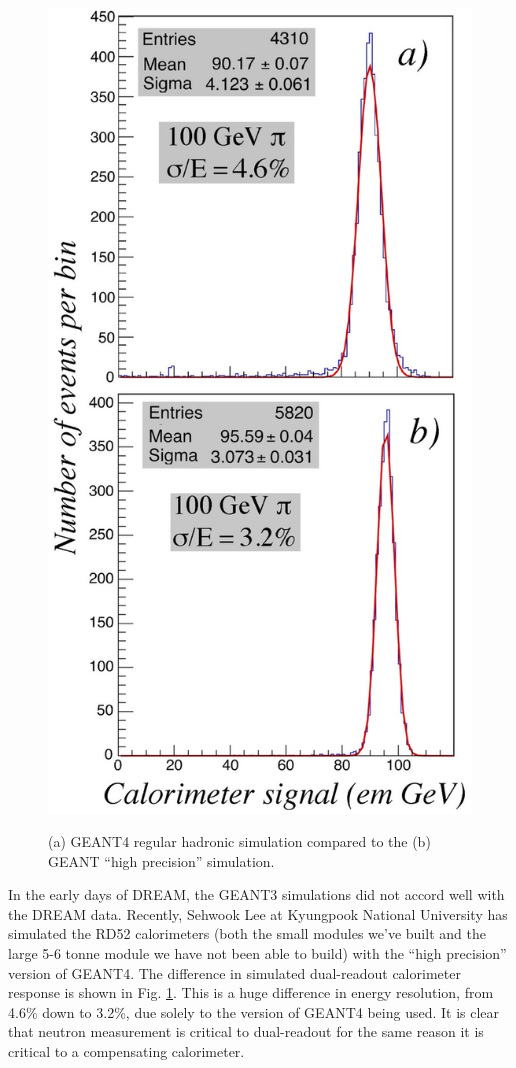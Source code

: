 \begin{figure}
 \centering
 \includegraphics[scale=0.20]{Calorimeter/DualReadout/f41-geant.jpg}
 \label{fig:hp}
 \caption{(a) GEANT4 regular hadronic simulation compared to the (b) GEANT ``high precision'' simulation.}
\end{figure}


In the early days of DREAM, the GEANT3 simulations did not accord well with the DREAM data.  Recently, Sehwook Lee
at Kyungpook National University has simulated the RD52 calorimeters (both the small modules we've built and the large
5-6 tonne module we have not been able to build) with the ``high precision'' version of GEANT4.  The difference in simulated dual-readout calorimeter response is shown in Fig. \ref{fig:hp}.  This is a huge difference in energy resolution, from 4.6\% down to 3.2\%, due solely to the version of GEANT4
being used.    It is clear that neutron measurement is critical to 
dual-readout for the same reason it is critical to a compensating calorimeter.



